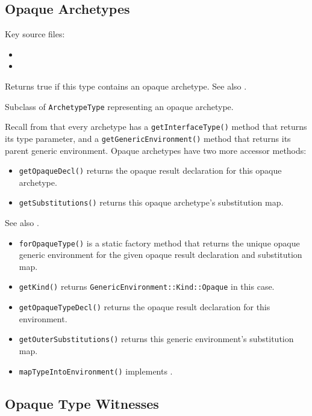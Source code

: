 \documentclass[../generics]{subfiles}
\begin{document}
\subsection*{Opaque Archetypes}

Key source files:
\begin{itemize}
\item {}
\item {}
\end{itemize}

Returns true if this type contains an opaque archetype. See also .

Subclass of \texttt{ArchetypeType} representing an opaque archetype.

Recall from  that every archetype has a \texttt{getInterfaceType()} method that returns its type parameter, and a \texttt{getGenericEnvironment()} method that returns its parent generic environment. Opaque archetypes have two more accessor methods:
\begin{itemize}
\item \texttt{getOpaqueDecl()} returns the opaque result declaration for this opaque archetype.
\item \texttt{getSubstitutions()} returns this opaque archetype's substitution map.
\end{itemize}

See also .
\begin{itemize}
\item \texttt{forOpaqueType()} is a static factory method that returns the unique opaque generic environment for the given opaque result declaration and substitution map.
\item \texttt{getKind()} returns \texttt{GenericEnvironment::Kind::Opaque} in this case.
\item \texttt{getOpaqueTypeDecl()} returns the opaque result declaration for this environment.
\item \texttt{getOuterSubstitutions()} returns this generic environment's substitution map.
\item \texttt{mapTypeIntoEnvironment()} implements .
\end{itemize}

\subsection*{Opaque Type Witnesses}
\end{document}
